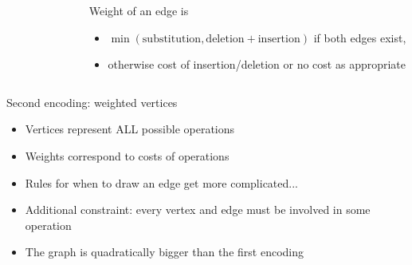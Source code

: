 \documentclass{beamer}
\begin{document}
\begin{frame}
  \begin{columns}
    \begin{column}{0.3\textwidth}
      \begin{figure}
      \end{figure}
    \end{column}
    \begin{column}{0.7\textwidth}
      Weight of an edge is
      \begin{itemize}
      \item $\min(\text{substitution}, \text{deletion}+\text{insertion})$ if both edges exist,
      \item otherwise cost of insertion/deletion or no cost as appropriate
      \end{itemize}
    \end{column}
  \end{columns}
\end{frame}
\begin{frame}{Second encoding: weighted vertices}
\begin{itemize}
\item Vertices represent ALL possible operations
\item Weights correspond to costs of operations
\item Rules for when to draw an edge get more complicated...
\item Additional constraint: every vertex and edge must be involved in some operation
\item The graph is quadratically bigger than the first encoding
\end{itemize}
\end{frame}
\end{document}
